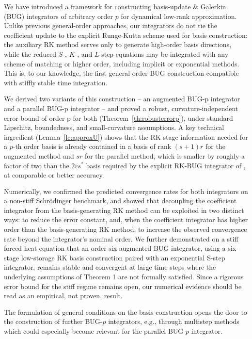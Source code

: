\documentclass[preprint,runningheads]{svjour3}
\begin{document}
 {We have introduced a framework for constructing basis-update \& Galerkin (BUG) integrators of arbitrary order $p$ for dynamical low-rank approximation. Unlike previous general-order approaches, our integrators do not tie the coefficient update to the explicit Runge-Kutta scheme used for basis construction: the auxiliary RK method serves only to generate high-order basis directions, while the reduced $S$-, $K$-, and $L$-step equations may be integrated with any scheme of matching or higher order, including implicit or exponential methods. This is, to our knowledge, the first general-order BUG construction compatible with stiffly stable time integration.

We derived two variants of this construction -- an augmented BUG-p integrator and a parallel BUG-p integrator -- and proved a robust, curvature-independent error bound of order p for both (Theorem~\ref{th:robusterrorp}), under standard Lipschitz, boundedness, and small-curvature assumptions. A key technical ingredient (Lemma~\ref{le:approxU}) shows that the RK stage information needed for a $p$-th order basis is already contained in a basis of rank $(s+1)r$ for the augmented method and $sr$ for the parallel method, which is smaller by roughly a factor of two than the $2rs^*$ basis required by the explicit RK-BUG integrator of \cite{nobile2025robust}, at comparable or better accuracy.

Numerically, we confirmed the predicted convergence rates for both integrators on a non-stiff Schrödinger benchmark, and showed that decoupling the coefficient integrator from the basis-generating RK method can be exploited in two distinct ways: to reduce the error constant, and, when the coefficient integrator has higher order than the basis-generating RK method, to increase the observed convergence rate beyond the integrator's nominal order. We further demonstrated on a stiff forced heat equation that an order-six augmented BUG integrator, using a six-stage low-storage RK basis construction paired with an exponential S-step integrator, remains stable and convergent at large time steps where the underlying assumptions of Theorem 1 are not formally satisfied. Since a rigorous error bound for the stiff regime remains open, our numerical evidence should be read as an empirical, not proven, result.

The formulation of general conditions on the basis construction opens the door to the construction of further BUG-$p$ integrators, e.g., through multistep methods which could especially become relevant for the parallel BUG-$p$ integrator.}
\end{document}
